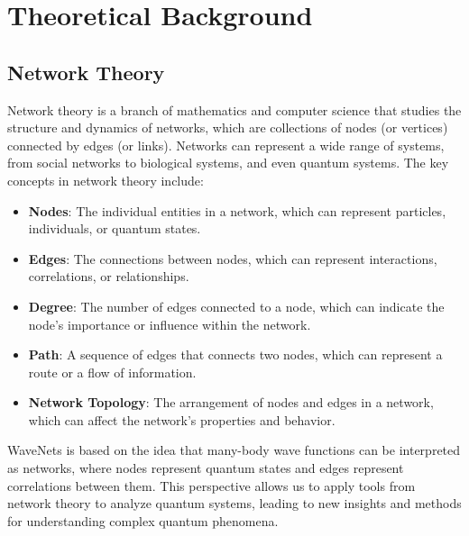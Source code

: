 \documentclass[a4paper, 11pt]{article}
\begin{document}
\section{Theoretical Background}
\subsection{Network Theory}
Network theory is a branch of mathematics and computer science that studies the structure and dynamics of networks, which are collections of nodes (or vertices) connected by edges (or links). Networks can represent a wide range of systems, from social networks to biological systems, and even quantum systems. The key concepts in network theory include:
\begin{itemize}
    \item \textbf{Nodes}: The individual entities in a network, which can represent particles, individuals, or quantum states.
    \item \textbf{Edges}: The connections between nodes, which can represent interactions, correlations, or relationships.
    \item \textbf{Degree}: The number of edges connected to a node, which can indicate the node's importance or influence within the network.
    \item \textbf{Path}: A sequence of edges that connects two nodes, which can represent a route or a flow of information.
    \item \textbf{Network Topology}: The arrangement of nodes and edges in a network, which can affect the network's properties and behavior.
\end{itemize}



WaveNets is based on the idea that many-body wave functions can be interpreted as networks, where nodes represent quantum states and edges represent correlations between them. This perspective allows us to apply tools from network theory to analyze quantum systems, leading to new insights and methods for understanding complex quantum phenomena.
\end{document}
